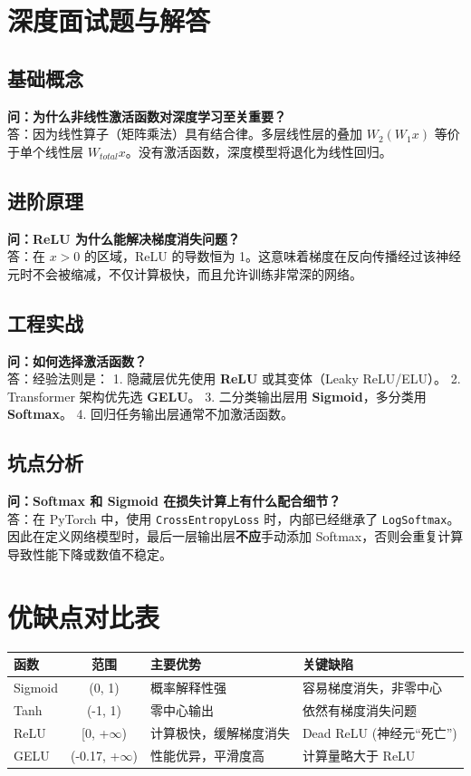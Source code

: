 \documentclass[12pt, a4paper]{book}
\begin{document}
\section{深度面试题与解答}
\subsection{基础概念}
\textbf{问：为什么非线性激活函数对深度学习至关重要？}\\
答：因为线性算子（矩阵乘法）具有结合律。多层线性层的叠加 $W_2(W_1 x)$ 等价于单个线性层 $W_{total} x$。没有激活函数，深度模型将退化为线性回归。

\subsection{进阶原理}
\textbf{问：ReLU 为什么能解决梯度消失问题？}\\
答：在 $x > 0$ 的区域，ReLU 的导数恒为 1。这意味着梯度在反向传播经过该神经元时不会被缩减，不仅计算极快，而且允许训练非常深的网络。

\subsection{工程实战}
\textbf{问：如何选择激活函数？}\\
答：经验法则是：
1. 隐藏层优先使用 \textbf{ReLU} 或其变体（Leaky ReLU/ELU）。
2. Transformer 架构优先选 \textbf{GELU}。
3. 二分类输出层用 \textbf{Sigmoid}，多分类用 \textbf{Softmax}。
4. 回归任务输出层通常不加激活函数。

\subsection{坑点分析}
\textbf{问：Softmax 和 Sigmoid 在损失计算上有什么配合细节？}\\
答：在 PyTorch 中，使用 \texttt{CrossEntropyLoss} 时，内部已经继承了 \texttt{LogSoftmax}。因此在定义网络模型时，最后一层输出层\textbf{不应}手动添加 Softmax，否则会重复计算导致性能下降或数值不稳定。

\section{优缺点对比表}

\begin{table}[h]
\centering
\begin{tabularx}{\textwidth}{|l|c|X|X|}
\hline
\textbf{函数} & \textbf{范围} & \textbf{主要优势} & \textbf{关键缺陷} \\
\hline
Sigmoid & (0, 1) & 概率解释性强 & 容易梯度消失，非零中心 \\
\hline
Tanh & (-1, 1) & 零中心输出 & 依然有梯度消失问题 \\
\hline
ReLU & [0, +$\infty$) & 计算极快，缓解梯度消失 & Dead ReLU (神经元“死亡”) \\
\hline
GELU & (-0.17, +$\infty$) & 性能优异，平滑度高 & 计算量略大于 ReLU \\
\hline
\end{tabularx}
\end{table}
\end{document}
